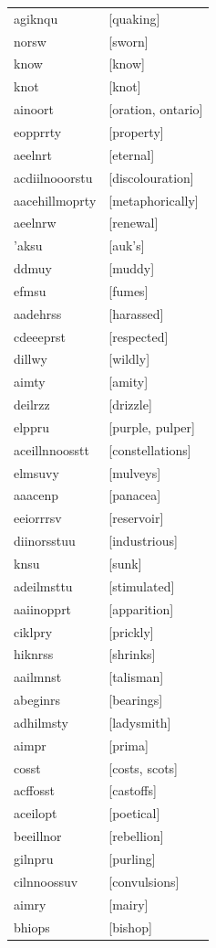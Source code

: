 \documentclass{article}
\begin{document}
\begin{tabular}{ll}
agiknqu & [quaking] \\
norsw & [sworn] \\
know & [know] \\
knot & [knot] \\
ainoort & [oration, ontario] \\
eopprrty & [property] \\
aeelnrt & [eternal] \\
acdiilnooorstu & [discolouration] \\
aacehillmoprty & [metaphorically] \\
aeelnrw & [renewal] \\
'aksu & [auk's] \\
ddmuy & [muddy] \\
efmsu & [fumes] \\
aadehrss & [harassed] \\
cdeeeprst & [respected] \\
dillwy & [wildly] \\
aimty & [amity] \\
deilrzz & [drizzle] \\
elppru & [purple, pulper] \\
aceillnnoosstt & [constellations] \\
elmsuvy & [mulveys] \\
aaacenp & [panacea] \\
eeiorrrsv & [reservoir] \\
diinorsstuu & [industrious] \\
knsu & [sunk] \\
adeilmsttu & [stimulated] \\
aaiinopprt & [apparition] \\
ciklpry & [prickly] \\
hiknrss & [shrinks] \\
aailmnst & [talisman] \\
abeginrs & [bearings] \\
adhilmsty & [ladysmith] \\
aimpr & [prima] \\
cosst & [costs, scots] \\
acffosst & [castoffs] \\
aceilopt & [poetical] \\
beeillnor & [rebellion] \\
gilnpru & [purling] \\
cilnnoossuv & [convulsions] \\
aimry & [mairy] \\
bhiops & [bishop] \\

\end{tabular}
\end{document}
